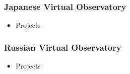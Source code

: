 \documentclass[11pt]{article}
\begin{document}
          \subsubsection{Japanese Virtual Observatory}
              \begin{itemize}
                  \item Projects
              \end{itemize}

          \subsubsection{Russian Virtual Observatory}
              \begin{itemize}
                  \item Projects
              \end{itemize}
\end{document}
